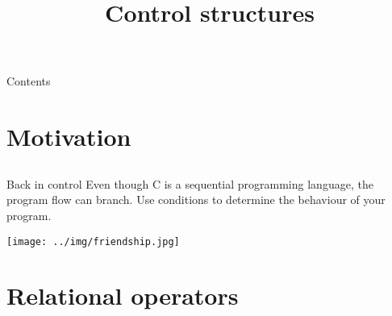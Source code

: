 
\newcommand{\topic}{
	Control structures
}
\usepackage{tikz}
\title{\topic}
\supertitle{\course}
\date{}



\maketitle

\begin{frame}{Contents}
	\tableofcontents
\end{frame}

\section{Motivation}
\subsection{}
\begin{frame}{Back in control}
	Even though C is a sequential programming language, the program flow can branch.
	Use conditions to determine the behaviour of your program.
	\centerline{\texttt{[image: ../img/friendship.jpg]}}
\end{frame}

\section{Relational operators}
